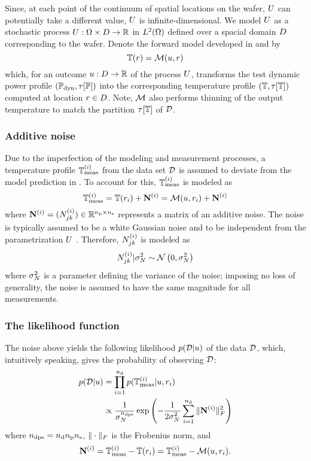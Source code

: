 Since, at each point of the continuum of spatial locations on the wafer, $U$ can potentially take a different value, $U$ is infinite-dimensional. We model $U$ as a stochastic process $U: \Omega \times D \to \mathbb{R}$ in ${L^{2}(\Omega)}$ defined over a spacial domain $D$ corresponding to the wafer. Denote the forward model developed in  and  by
\begin{equation} \elabel{model}
  \mT(\r) = \model{\u, \r}
\end{equation}
which, for an outcome $u: D \to \mathbb{R}$ of the process $U$, transforms the test dynamic power profile $(\mathbb{P}_{\text{dyn}}, \tau[\mathbb{P}])$ into the corresponding temperature profile $\profileT$ computed at location $r \in D$. Note, $\model$ also performs thinning of the output temperature to match the partition $\tau[\mathbb{T}]$ of $\mathcal{D}$.

\subsubsection{Additive noise}
Due to the imperfection of the modeling and measurement processes, a temperature profile $\mathbb{T}^{(i)}_{\text{meas}}$ from the data set $\mathcal{D}$ is assumed to deviate from the model prediction in . To account for this, $\mathbb{T}^{(i)}_{\text{meas}}$ is modeled as
\[
  \mT^{(i)}_\meas = \mT(\r_i) + \mnoise^{(i)} = \model{\u, \r_i} + \mnoise^{(i)}
\]
where $\mathbf{N}^{(i)} = (N^{(i)}_{jk}) \in \mathbb{R}^{{n_\text{p}} \times {n_\text{s}}}$ represents a matrix of an additive noise. The noise is typically assumed to be a white Gaussian noise and to be independent from the parametrization $U$ \cite{marzouk2007, el-moselhy2012}. Therefore, $N^{(i)}_{jk}$ is modeled as
\[
  N^{(i)}_{jk} | \sigma^2_N \sim \mathcal{N}\left( 0, \sigma^2_N \right)
\]
where $\sigma^2_N$ is a parameter defining the variance of the noise; imposing no loss of generality, the noise is assumed to have the same magnitude for all measurements.

\subsubsection{The likelihood function}
The noise above yields the following likelihood $\f{\data | \u}$ of the data $\mathcal{D}$, which, intuitively speaking, gives the probability of observing $\mathcal{D}$:
\begin{align}
  \f{\data | \u} & = \prod_{i = 1}^{\ndata} \f{\mT^{(i)}_\meas| \u, \r_i} \nonumber \\
  & \propto \frac{1}{\param_\noise^\ndcs} \exp\left( -\frac{1}{2 \param^2_\noise} \sum_{i = 1}^\ndata \fnorm{\mnoise^{(i)}}^2 \right) \elabel{likelihood}
\end{align}
where ${n_\text{dps}} = {n_\text{d}} {n_\text{p}} {n_\text{s}}$, $\| \cdot \|_F$ is the Frobenius norm, and
\[
  \mnoise^{(i)} = \mT^{(i)}_{\meas} - \mT(\r_i) = \mT^{(i)}_{\meas} - \model{\u, \r_i}.
\]

